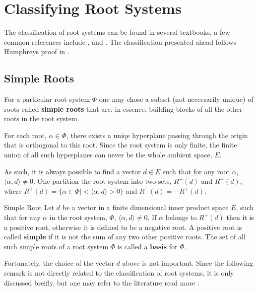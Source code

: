 \chapter{Classifying Root Systems}
The classification of root systems can be found in several textbooks, a few common references include
\cite{fulton_harris_2004}, \cite{humphreys_1972} and  \cite{Tauvel2005}.
The classification presented ahead follows Humphreys proof in \cite{humphreys_1972}.

\section{Simple Roots}

For a particular root system $\Phi$ one may chose a subset (not neccesarily unique) of
roots called \textbf{simple roots} that are, in essence, building blocks of all the other roots
in the root system. \newline

For each root, $\alpha \in \Phi$, there exists a uniqe hyperplane passing through the origin that
is orthogonal to this root. Since the root system is only finite, the finite union of all
such hyperplanes can never be the whole ambient space, $E$. \newline

As such, it is always possible to find a vector $d \in E$ such that for any root $\alpha$, $\langle \alpha, d \rangle \not= 0$.
One partition the root system into two sets, $R^+(d)$ and $R^-(d)$, where $R^+(d) = \{
    \alpha \in \Phi |  <\langle \alpha, d \rangle > 0\}$ and $R^-(d) = -R^+(d)$. \newline

\begin{nameddefinition}{Simple Root}
    Let $d$ be a vector in a finite dimensional inner product space $E$, such that for any $\alpha$ in the root system, $\Phi$,
    $\langle \alpha, d \rangle \not= 0$. 
    If $\alpha$ belongs to $R^+(d)$ then it is a positive root, otherwise it is defined
    to be a negative root.
    A positive root is called \textbf{simple} if it is not the sum of any two other positive roots.
    The set of all such simple roots of a root system $\Phi$ is called a \textbf{basis} for $\Phi$.
\end{nameddefinition}

Fortunately, the choice of the vector $d$ above is not important.
Since the following remark is not directly related to the classification of root systems, it is only
discussed breifly, but one may refer to the literature read more \cite{Humphreys_1990}. \newline

